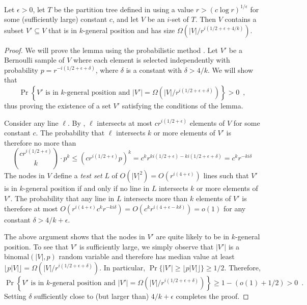 \documentclass{patmorin}
\begin{document}
\begin{lem}
  Let $\epsilon > 0$, let $T$ be the partition tree defined in
   using a value $r>(c\log r)^{1/\epsilon}$ for
  some (sufficiently large) constant $c$, and let $V$ be an $i$-set of
  $T$.  Then $V$ contains a subset $V'\subseteq V$ that is in $k$-general
  position and has size $\Omega(|V|/r^{i(1/2+\epsilon + 4/k)})$.
\end{lem}

\begin{proof}
  We will prove the lemma using the probabilistic method \cite{as08}.
  Let $V'$ be a Bernoulli sample of $V$ where each element is selected
  independently with probability $p=r^{-i(1/2+\epsilon+\delta)}$, where $\delta$ is a constant with $\delta > 4/k$.
  We will show that
  \[
     \Pr\left\{
        \mbox{$V'$ is in $k$-general position 
          and $|V'|=\Omega(|V|/r^{i(1/2+\epsilon+\delta)})$}
      \right\} > 0 \enspace ,
  \]
  thus proving the existence of a set $V'$ satisfying the conditions of
  the lemma.

  Consider any line $\ell$. By , $\ell$
  intersects at most $cr^{i(1/2+\epsilon)}$ elements of $V$ for some
  constant $c$. The probability that $\ell$ intersects $k$ or more
  elements of $V'$ is therefore no more than
  \[
    \binom{cr^{i(1/2+\epsilon)}}{k}\cdot p^k
    \le (cr^{i(1/2+\epsilon)}p)^k
    = c^kr^{ki(1/2+\epsilon)-ki(1/2+\epsilon+\delta)}
    = c^kr^{-ki\delta}
  \]
  The nodes in $V$ define a \emph{test set} $L$ of $O(|V|^2)=O(r^{i(4+\epsilon)})$
  lines such that $V'$ is in $k$-general position if and only if no line
  in $L$ intersects $k$ or more elements of $V'$.   The probability that
  any line in $L$ intersects more than $k$ elements of $V'$ is therefore
  at most $O(r^{i(4+\epsilon)}c^kr^{-ki\delta})=O(c^kr^{i(4+\epsilon-k\delta)})=o(1)$ for any
  constant $\delta > 4/k+\epsilon$.

  The above argument shows that the nodes in $V'$ are quite likely
  to be in $k$-general position.  To see that $V'$ is sufficiently
  large, we simply observe that $|V'|$ is a $\mathrm{binomal}(|V|,p)$
  random variable and therefore has median value at least
  $\lfloor{p|V|}\rfloor=\Omega(|V|/r^{i(1/2+\epsilon + \delta)})$.
  In particular, $\Pr\{|V'|\ge \lfloor{p|V|}\rfloor\}\ge 1/2$.  Therefore,
  \[
     \Pr\left\{
        \mbox{$V'$ is in $k$-general position 
          and $|V'|=\Omega(|V|/r^{i(1/2+\epsilon+\delta)})$}
      \right\} \ge 1- (o(1) + 1/2) > 0 \enspace .
  \]
  Setting $\delta$ sufficiently close to (but larger than) $4/k+\epsilon$
  completes the proof.
\end{proof}
\end{document}
